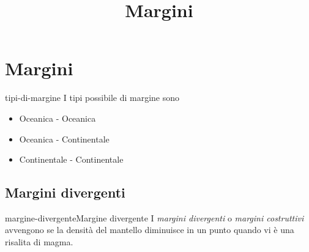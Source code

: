 \documentclass[preview]{standalone}
\begin{document}
\title{Margini}
\genpage

\section{Margini}

\begin{snippet}{tipi-di-margine}
    I tipi possibile di margine sono
    \begin{itemize}
        \item Oceanica - Oceanica
        \item Oceanica - Continentale
        \item Continentale - Continentale
    \end{itemize}
\end{snippet}

\subsection{Margini divergenti}

\begin{snippetdefinition}{margine-divergente}{Margine divergente}
    I \textit{margini divergenti} o \textit{margini costruttivi} avvengono se
    la densità del mantello diminuisce in un punto quando vi è una risalita di magma.
\end{snippetdefinition}
\end{document}
